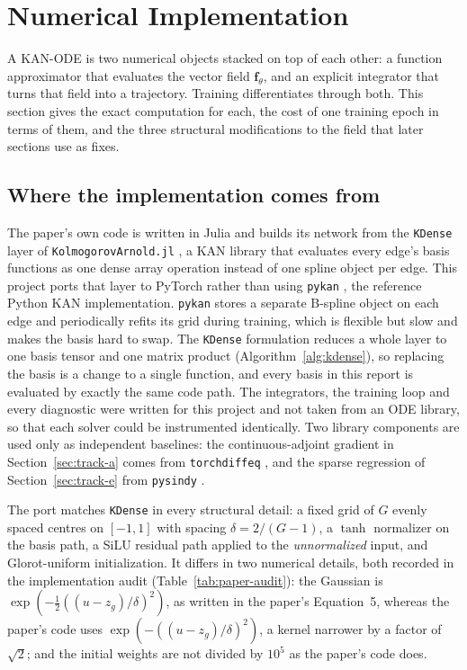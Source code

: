 \section{Numerical Implementation}
\label{sec:numerics}

A KAN-ODE is two numerical objects stacked on top of each other: a
function approximator that evaluates the vector field $\mathbf f_\theta$, and
an explicit integrator that turns that field into a trajectory. Training
differentiates through both. This section gives the exact computation for
each, the cost of one training epoch in terms of them, and the three
structural modifications to the field that later sections use as fixes.

\subsection{Where the implementation comes from}

The paper's own code \cite{koenig2024kanoderepo} is written in Julia and
builds its network from the \texttt{KDense} layer of
\texttt{Kolmogorov\-Arnold.jl} \cite{puri2024kolmogorovarnoldjl}, a KAN
library that evaluates every edge's basis functions as one dense array
operation instead of one spline object per edge. This project ports that
layer to PyTorch rather than using \texttt{pykan} \cite{liu2024kan}, the
reference Python KAN implementation. \texttt{pykan} stores a separate
B-spline object on each edge and periodically refits its grid during
training, which is flexible but slow and makes the basis hard to swap. The
\texttt{KDense} formulation reduces a whole layer to one basis tensor and one
matrix product (Algorithm~\ref{alg:kdense}), so replacing the basis is a
change to a single function, and every basis in this report is evaluated by
exactly the same code path. The integrators, the training loop and every
diagnostic were written for this project and not taken from an ODE library,
so that each solver could be instrumented identically. Two library
components are used only as independent baselines: the continuous-adjoint
gradient in Section~\ref{sec:track-a} comes from \texttt{torchdiffeq}
\cite{torchdiffeq}, and the sparse regression of Section~\ref{sec:track-e}
from \texttt{pysindy} \cite{desilva2020pysindy,kaptanoglu2022pysindy}.

The port matches \texttt{KDense} in every structural detail: a fixed grid of
$G$ evenly spaced centres on $[-1,1]$ with spacing $\delta=2/(G-1)$, a $\tanh$
normalizer on the basis path, a SiLU residual path applied to the
\emph{unnormalized} input, and Glorot-uniform initialization. It differs in
two numerical details, both recorded in the implementation audit
(Table~\ref{tab:paper-audit}): the Gaussian is
$\exp(-\tfrac12((u-z_g)/\delta)^2)$, as written in the paper's Equation~5, whereas
the paper's code uses $\exp(-((u-z_g)/\delta)^2)$, a kernel narrower by a factor
of $\sqrt2$; and the initial weights are not divided by $10^5$ as the
paper's code does.

